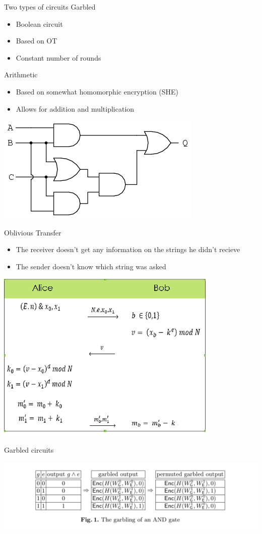 \documentclass[11pt,t]{beamer}
\begin{document}
\begin{frame}{Two types of circuits}
Garbled
\begin{itemize}
    \item Boolean circuit
    \item Based on OT
    \item Constant number of rounds
\end{itemize}
Arithmetic
\begin{itemize}
    \item Based on somewhat homomorphic encryption (SHE)
    \item Allows for addition and multiplication
\end{itemize}
\begin{center}
	\includegraphics[width=.4\textwidth]{boolean}
\end{center}
\end{frame}
\begin{frame}{Oblivious Transfer}
\begin{itemize}
    \item The receiver doesn't get any information on the strings he didn't recieve
    \item The sender doesn't know which string was asked
\end{itemize}
\begin{center}
	\includegraphics[width=.5\textwidth]{oblivious}
\end{center}
\end{frame}
\begin{frame}{Garbled circuits}
\begin{center}
	\includegraphics[width=\textwidth]{garbled}
\end{center}
\end{frame}
\end{document}
